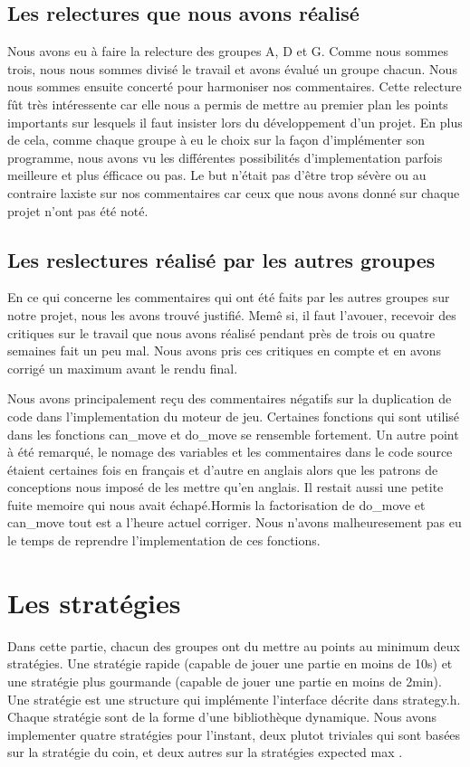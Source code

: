 \documentclass[12pt]{article}
\begin{document}
\subsection{Les relectures que nous avons r\'ealis\'e}
Nous avons eu \`a faire la relecture des groupes A, D et G. Comme nous sommes
trois, nous nous sommes divis\'e le travail et avons \'evalu\'e un groupe
chacun. Nous nous sommes ensuite concert\'e pour harmoniser nos commentaires.
Cette relecture f\^ut tr\`es int\'eressente car elle nous a permis de mettre au
premier plan les points importants sur lesquels il faut insister lors du
d\'eveloppement d'un projet. En plus de cela, comme chaque groupe à eu le choix
sur la façon d'impl\'ementer son programme, nous avons vu les diff\'erentes
possibilit\'es d'implementation parfois meilleure et plus \'efficace ou pas. Le
but n'\'etait pas d'\^etre trop s\'ev\`ere ou au contraire laxiste sur nos
commentaires car ceux que nous avons donn\'e sur chaque projet n'ont pas \'et\'e
not\'e.
\subsection{Les reslectures r\'ealis\'e par les autres groupes}
\label{notre_etude}
En ce qui concerne les commentaires qui ont \'et\'e faits par les autres groupes
sur notre projet, nous les avons trouv\'e justifi\'e. Mem\^e si, il faut
l'avouer, recevoir des \og critiques \fg{} sur le travail que nous avons
r\'ealis\'e pendant pr\`es de trois ou quatre semaines fait un peu mal. Nous avons pris ces critiques en compte et en avons corrig\'e un
maximum avant le rendu final. 
\par Nous avons principalement reçu des commentaires n\'egatifs sur la
duplication de code dans l'implementation du moteur de jeu. Certaines fonctions
qui sont utilis\'e dans les fonctions \og can\_move \fg{} et \og do\_move \fg{} se
rensemble fortement. Un autre point \`a \'et\'e remarqu\'e, le nomage des
variables et les commentaires dans le code source \'etaient certaines fois en
français et d'autre en anglais alors que les patrons de conceptions nous
impos\'e de les mettre qu'en anglais. Il restait aussi une petite fuite memoire
qui nous avait échapé.Hormis la factorisation de do\_move et can\_move tout est a l'heure actuel corriger. Nous n'avons malheuresement pas eu le temps de reprendre l'implementation de ces fonctions.


\newpage
\section{Les strat\'egies}
Dans cette partie, chacun des groupes ont du mettre au points au minimum deux
strat\'egies. Une strat\'egie rapide (capable de jouer une partie en moins de
10s) et une strat\'egie plus gourmande (capable de jouer une partie en moins de
2min). Une strat\'egie est une structure qui impl\'emente l’interface d\'ecrite
dans strategy.h. Chaque strat\'egie sont de la forme d’une biblioth\`eque
dynamique. Nous avons implementer quatre strat\'egies pour l'instant, deux
plutot triviales qui sont basées sur la strat\'egie du coin, et deux autres sur
la strat\'egies \og expected max \fg{}. 
\end{document}
